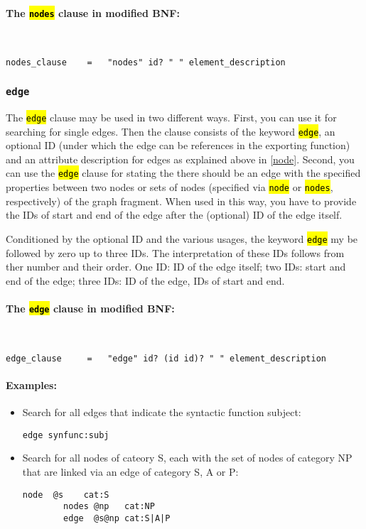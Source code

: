 \documentclass[12pt]{scrartcl}
\newcommand{\code}[1]{\hl{\texttt{#1}}}
\begin{document}
\paragraph*{The \code{nodes} clause in modified BNF:}
~
\begin{lstlisting}
nodes_clause    =   "nodes" id? " " element_description
\end{lstlisting}


\subsubsection{\texttt{edge}}\label{edge}

The \code{edge} clause may be used in two different ways.
First, you can use it for searching for single edges.
Then the clause consists of the keyword \code{edge}, an optional ID (under which the edge can be references in the exporting function) and an attribute description for edges as explained above in \ref{node}.
Second, you can use the \code{edge} clause for stating the there should be an edge with the specified properties between two nodes or sets of nodes (specified via \code{node} or \code{nodes}, respectively) of the graph fragment.
When used in this way, you have to provide the IDs of start and end of the edge after the (optional) ID of the edge itself.

Conditioned by the optional ID and the various usages, the keyword \code{edge} my be followed by zero up to three IDs.
The interpretation of these IDs follows from ther number and their order.
One ID: ID of the edge itself; two IDs: start and end of the edge; three IDs: ID of the edge, IDs of start and end.

\paragraph*{The \code{edge} clause in modified BNF:}
~
\begin{lstlisting}
edge_clause     =   "edge" id? (id id)? " " element_description
\end{lstlisting}

\paragraph*{Examples:}
\begin{itemize}
	\item Search for all edges that indicate the syntactic function subject:
	\begin{lstlisting}[gobble=8,aboveskip=.6em,belowskip=.2em]
		edge synfunc:subj
	\end{lstlisting}
	\item Search for all nodes of cateory S, each with the set of nodes of category NP that are linked via an edge of category S, A or P:
	\begin{lstlisting}[gobble=8,aboveskip=.6em,belowskip=.2em]
		node  @s    cat:S
		nodes @np   cat:NP
		edge  @s@np cat:S|A|P
	\end{lstlisting}
\end{itemize}
\end{document}
